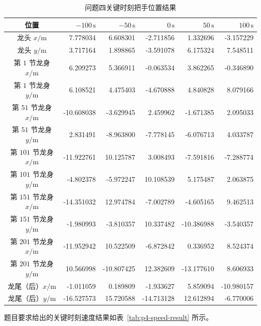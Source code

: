 \begin{table}[H]
    \centering
    \caption{问题四关键时刻把手位置结果}
    \label{tab:p4-position-result}
    \begin{tabular}{c r r r r r}
        \toprule
        位置 & $-100\,\mathrm{s}$ & $-50\,\mathrm{s}$ & $0\,\mathrm{s}$ & $50\,\mathrm{s}$ & $100\,\mathrm{s}$ \\
        \midrule
        龙头 $x/\mathrm{m}$ & 7.778034 & 6.608301 & -2.711856 & 1.332696 & -3.157229 \\
        龙头 $y/\mathrm{m}$ & 3.717164 & 1.898865 & -3.591078 & 6.175324 & 7.548511 \\
        第 $1$ 节龙身 $x/\mathrm{m}$ & 6.209273 & 5.366911 & -0.063534 & 3.862265 & -0.346890 \\
        第 $1$ 节龙身 $y/\mathrm{m}$ & 6.108521 & 4.475403 & -4.670888 & 4.840828 & 8.079166 \\
        第 $51$ 节龙身 $x/\mathrm{m}$ & -10.608038 & -3.629945 & 2.459962 & -1.671385 & 2.095033 \\
        第 $51$ 节龙身 $y/\mathrm{m}$ & 2.831491 & -8.963800 & -7.778145 & -6.076713 & 4.033787 \\
        第 $101$ 节龙身 $x/\mathrm{m}$ & -11.922761 & 10.125787 & 3.008493 & -7.591816 & -7.288774 \\
        第 $101$ 节龙身 $y/\mathrm{m}$ & -4.802378 & -5.972247 & 10.108539 & 5.175487 & 2.063875 \\
        第 $151$ 节龙身 $x/\mathrm{m}$ & -14.351032 & 12.974784 & -7.002789 & -4.605165 & 9.462513 \\
        第 $151$ 节龙身 $y/\mathrm{m}$ & -1.980993 & -3.810357 & 10.337482 & -10.386988 & -3.540357 \\
        第 $201$ 节龙身 $x/\mathrm{m}$ & -11.952942 & 10.522509 & -6.872842 & 0.336952 & 8.524374 \\
        第 $201$ 节龙身 $y/\mathrm{m}$ & 10.566998 & -10.807425 & 12.382609 & -13.177610 & 8.606933 \\
        龙尾（后）$x/\mathrm{m}$ & -1.011059 & 0.189809 & -1.933627 & 5.859094 & -10.980157 \\
        龙尾（后）$y/\mathrm{m}$ & -16.527573 & 15.720588 & -14.713128 & 12.612894 & -6.770006 \\
        \bottomrule
    \end{tabular}
\end{table}

题目要求给出的关键时刻速度结果如表~\ref{tab:p4-speed-result} 所示。

